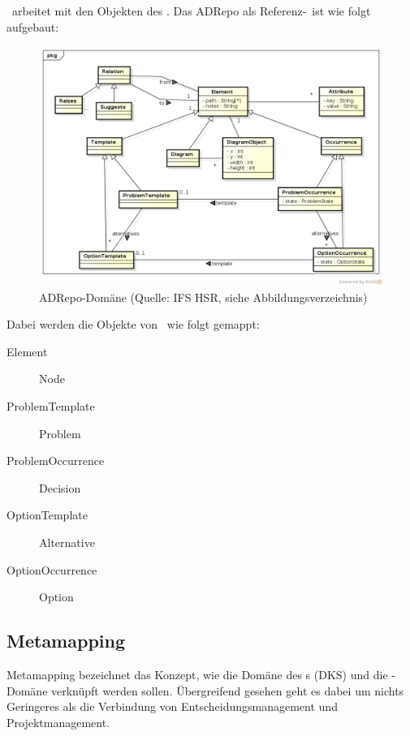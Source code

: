 			\eeppi\ arbeitet mit den Objekten des \dks. Das ADRepo als Referenz-\dks\ ist wie folgt aufgebaut:
			\begin{figure}[H]
				\includegraphics[width=\linewidth]{architecture/media/img/dksDomain.png}
				\centering
				\caption[ADRepo-Domäne\newline 
				]{ADRepo-Domäne (Quelle: IFS HSR, siehe Abbildungsverzeichnis)}
				\label{fig:dksDomain}
			\end{figure}
			
			Dabei werden die Objekte von \eeppi\ wie folgt gemappt:
			\begin{description}
				\item[Element] Node
				\item[ProblemTemplate] Problem
				\item[ProblemOccurrence] Decision
				\item[OptionTemplate] Alternative
				\item[OptionOccurrence] Option
			\end{description}
			
			
		\subsection{Metamapping}
			\label{subsec:metamapping}		
		
			Metamapping bezeichnet das Konzept, 
			wie die Domäne des \dks s (DKS) und die \eeppi -Domäne verknüpft werden sollen.
			Übergreifend gesehen geht es dabei um nichts Geringeres als die Verbindung von Entscheidungsmanagement und Projektmanagement.			
		
